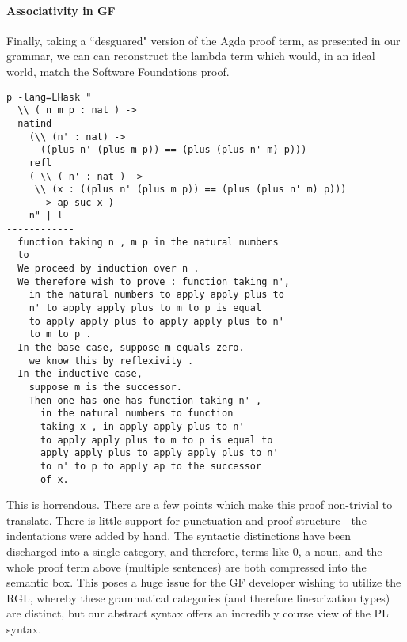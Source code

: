 \paragraph{Associativity in GF} \label{appHell}

Finally, taking a ``desguared" version of the Agda proof term, as presented in
our grammar, we can can reconstruct the lambda term which would, in an ideal
world, match the Software Foundations proof.

\begin{verbatim}
p -lang=LHask "
  \\ ( n m p : nat ) ->
  natind
    (\\ (n' : nat) ->
      ((plus n' (plus m p)) == (plus (plus n' m) p)))
    refl
    ( \\ ( n' : nat ) ->
     \\ (x : ((plus n' (plus m p)) == (plus (plus n' m) p)))
      -> ap suc x )
    n" | l
------------
  function taking n , m p in the natural numbers
  to
  We proceed by induction over n .
  We therefore wish to prove : function taking n',
    in the natural numbers to apply apply plus to
    n' to apply apply plus to m to p is equal
    to apply apply plus to apply apply plus to n'
    to m to p .
  In the base case, suppose m equals zero.
    we know this by reflexivity .
  In the inductive case,
    suppose m is the successor.
    Then one has one has function taking n' ,
      in the natural numbers to function
      taking x , in apply apply plus to n'
      to apply apply plus to m to p is equal to
      apply apply plus to apply apply plus to n'
      to n' to p to apply ap to the successor
      of x.
\end{verbatim}

This is horrendous. There are a few points which make this proof non-trivial to
translate. There is little support for punctuation and proof structure - the
indentations were added by hand. The syntactic distinctions have been discharged
into a single  category, and therefore, terms like $0$, a noun, and
the whole proof term above (multiple sentences) are both compressed into the
semantic box. This poses a huge issue for the GF developer wishing to utilize
the RGL, whereby these grammatical categories (and therefore linearization
types) are distinct, but our abstract syntax offers an incredibly course view of
the PL syntax.

